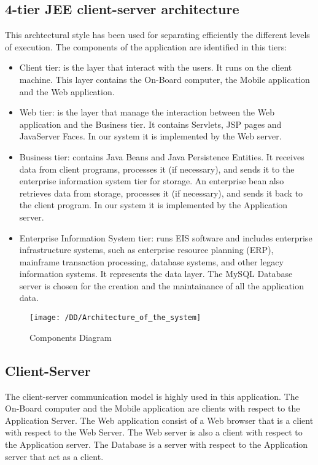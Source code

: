 \subsection{4-tier JEE client-server architecture}
	This archtectural style has been used for separating efficiently the different levels of execution. The components of the application are identified in this tiers:
	\begin{itemize}
		\item{Client tier: is the layer that interact with the users. It runs on the client machine. This layer contains the On-Board computer, the Mobile application and the Web application.}
		\item{Web tier: is the layer that manage the interaction between the Web application and the Business tier. It contains Servlets, JSP pages and JavaServer Faces. In our system it is implemented by the Web server.}%
		\item{Business tier: contains Java Beans and Java Persistence Entities. It receives data from client programs, processes it (if necessary), and sends it to the enterprise information system tier for storage. An enterprise bean also retrieves data from storage, processes it (if necessary), and sends it back to the client program. In our system it is implemented by the Application server.}
		\item{Enterprise Information System tier: runs EIS software and includes enterprise infrastructure systems, such as enterprise resource planning (ERP), mainframe transaction processing, database systems, and other legacy information systems. It represents the data layer. The MySQL Database server is chosen for the creation and the maintainance of all the application data.}
	\end{itemize}
	\begin{figure}[!h]
  \centering
  \vspace{0.2cm}
  \texttt{[image: /DD/Architecture\_of\_the\_system]}\\
  \vspace{0.4cm}
  \caption{Components Diagram} 
  \label{fig:Architecture of the system} 
\end{figure}
\subsection{Client-Server}
	The client-server communication model is highly used in this application.
	The On-Board computer and the Mobile application are clients with respect to the Application Server. The Web application consist of a Web browser that is a client with respect to the Web Server. The Web server is also a client with respect to the Application server. The Database is a server with respect to the Application server that act as a client.
